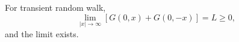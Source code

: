 For transient random walk,
\[
\lim_{|x| \to \infty} [G(0,x) + G(0,-x)] = L \geq 0,
\]
and the limit exists.
